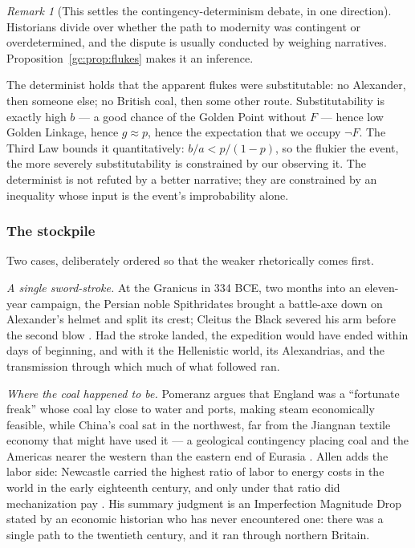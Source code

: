 \documentclass[11pt]{article}
\numberwithin{equation}{section}
\theoremstyle{plain}
\theoremstyle{definition}
\theoremstyle{remark}
\newtheorem{remark}[theorem]{Remark}
\begin{document}
\begin{remark}[This settles the contingency-determinism debate, in one
direction]\label{gc:rem:determinism}
Historians divide over whether the path to modernity was contingent or
overdetermined, and the dispute is usually conducted by weighing
narratives. Proposition~\ref{gc:prop:flukes} makes it an inference.

The determinist holds that the apparent flukes were substitutable: no
Alexander, then someone else; no British coal, then some other route.
Substitutability is exactly high $b$ --- a good chance of the Golden
Point without $F$ --- hence low Golden Linkage, hence $g \approx p$,
hence the expectation that we occupy $\neg F$. The Third Law bounds it
quantitatively: $b/a < p/(1-p)$, so the flukier the event, the more
severely substitutability is constrained by our observing it. The
determinist is not refuted by a better narrative; they are constrained
by an inequality whose input is the event's improbability alone.
\end{remark}

\subsubsection{The stockpile}\label{gc:subsub:stockpile}

Two cases, deliberately ordered so that the weaker rhetorically comes
first.

\emph{A single sword-stroke.} At the Granicus in 334 BCE, two months
into an eleven-year campaign, the Persian noble Spithridates brought a
battle-axe down on Alexander's helmet and split its crest; Cleitus the
Black severed his arm before the second blow \cite{Arrian,
PlutarchAlex}. Had the stroke landed, the expedition would have ended
within days of beginning, and with it the Hellenistic world, its
Alexandrias, and the transmission through which much of what followed
ran.

\emph{Where the coal happened to be.} Pomeranz argues that England was
a ``fortunate freak'' whose coal lay close to water and ports, making
steam economically feasible, while China's coal sat in the northwest,
far from the Jiangnan textile economy that might have used it ---
a geological contingency placing coal and the Americas nearer the
western than the eastern end of Eurasia \cite{Pomeranz00}. Allen adds
the labor side: Newcastle carried the highest ratio of labor to energy
costs in the world in the early eighteenth century, and only under that
ratio did mechanization pay \cite{Allen09}. His summary judgment is
an Imperfection Magnitude Drop stated by an economic historian who has
never encountered one: there was a single path to the twentieth century,
and it ran through northern Britain.
\end{document}
